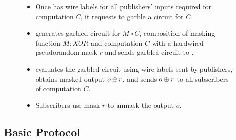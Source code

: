 \begin{figure}[h]
\begin{mdframed}[style=myframe]
\compute
\begin{itemize}[leftmargin=*]

	\item Once \broker has wire labels for all publishers' inputs required for
		computation $C$, it requests \garbler to garble a circuit for $C$.  
  
	\item \garbler generates garbled circuit for $M \circ C$, composition of
		masking function $M:XOR$ and computation $C$ with a hardwired pseudorandom
		mask $r$ and sends garbled circuit to \broker.

	\item \broker evaluates the garbled circuit using wire labels sent by
		publishers, obtains masked output $o \oplus r$, and sends $o \oplus r$ to all
		subscribers of computation $C$.
  
	\item Subscribers use mask $r$ to unmask the output $o$.

\end{itemize}

\end{mdframed}
\end{figure}

\subsection{Basic Protocol}


